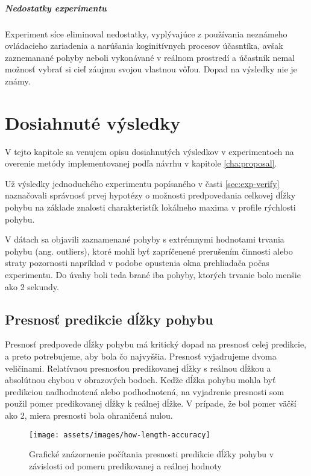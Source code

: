 \paragraph{Nedostatky experimentu}
Experiment síce eliminoval nedostatky, vyplývajúce z používania neznámeho ovládacieho zariadenia a narúšania koginitívnych procesov účasntíka, avšak zaznemanané pohyby neboli vykonávané v reálnom prostredí a účastník nemal možnosť vybrať si cieľ záujmu svojou vlastnou vôľou. Dopad na výsledky nie je známy.

\chapter{Dosiahnuté výsledky \label{cha:eva}}
V tejto kapitole sa venujem opisu dosiahnutých výsledkov v experimentoch na overenie metódy implementovanej podľa návrhu v kapitole \ref{cha:proposal}. 

Už výsledky jednoduchého experimentu popísaného v časti \ref{sec:exp-verify} naznačovali správnosť prvej hypotézy o možnosti predpovedania celkovej dĺžky pohybu na základe znalosti charakteristík lokálneho maxima v profile rýchlosti pohybu.

V dátach sa objavili zaznamenané pohyby s extrémnymi hodnotami trvania pohybu (ang. outliers), ktoré mohli byť zapríčenené prerušením činnosti alebo straty pozornosti napríklad v podobe opustenia okna prehliadača počas experimentu. Do úvahy boli teda brané iba pohyby, ktorých trvanie bolo menšie ako 2 sekundy.

\section{Presnosť predikcie dĺžky pohybu}
Presnosť predpovede dĺžky pohybu má kritický dopad na presnosť celej predikcie, a preto potrebujeme, aby bola čo najvyššia. Presnosť vyjadrujeme dvoma veličinami. Relatívnou presnosťou predikovanej dĺžky s reálnou dĺžkou a absolútnou chybou v obrazových bodoch. Keďže dĺžka pohybu mohla byť predikciou nadhodnotená alebo podhodnotená, na vyjadrenie presnosti som použil pomer predikovanej dĺžky k reálnej dĺžke. V prípade, že bol pomer väčší ako 2, miera presnosti bola ohraničená nulou.

\begin{figure}[h]
\centering
\texttt{[image: assets/images/how-length-accuracy]}
\caption{Grafické znázornenie počítania presnosti predikcie dĺžky pohybu v závislosti od pomeru predikovanej a reálnej hodnoty \label{fig:how-length-accuracy}}
\end{figure}

